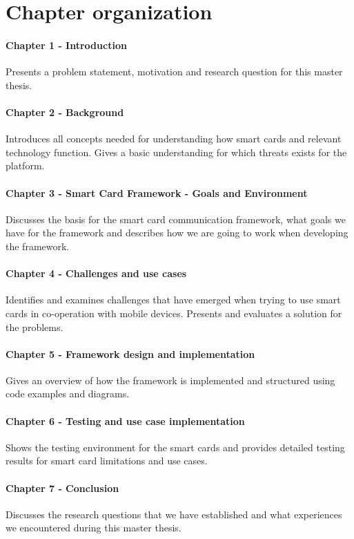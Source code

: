 \section{Chapter organization}
\paragraph{Chapter 1 - Introduction}
Presents a problem statement, motivation and research question for this master thesis.

\paragraph{Chapter 2 - Background}
Introduces all concepts needed for understanding how smart cards and relevant technology function. Gives a basic understanding for which threats exists for the platform.

\paragraph{Chapter 3 - Smart Card Framework - Goals and Environment}
Discusses the basis for the smart card communication framework, what goals we have for the framework and describes how we are going to work when developing the framework.

\paragraph{Chapter 4 - Challenges and use cases}
Identifies and examines challenges that have emerged when trying to use smart cards in co-operation with mobile devices. Presents and evaluates a solution for the problems.

\paragraph{Chapter 5 - Framework design and implementation}
Gives an overview of how the framework is implemented and structured using code examples and diagrams.

\paragraph{Chapter 6 - Testing and use case implementation}
Shows the testing environment for the smart cards and provides detailed testing results for smart card limitations and use cases.

\paragraph{Chapter 7 - Conclusion}
Discusses the research questions that we have established and what experiences we encountered during this master thesis.
